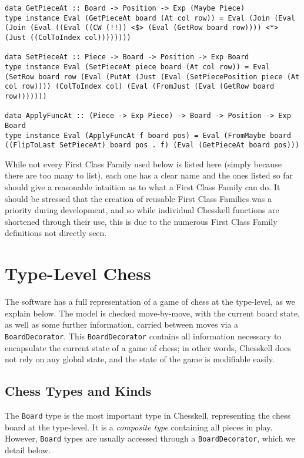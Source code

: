 \documentclass[12pt, a4paper, bibliography=totocnumbered]{scrreprt}
\newcommand{\inline}[1]{\lstinline[basicstyle=\ttfamily\footnotesize]{#1}}
\begin{document}
\begin{lstlisting}
data GetPieceAt :: Board -> Position -> Exp (Maybe Piece)
type instance Eval (GetPieceAt board (At col row)) = Eval (Join (Eval (Join (Eval ((Eval ((CW (!!)) <$> (Eval (GetRow board row)))) <*> (Just ((ColToIndex col))))))))

data SetPieceAt :: Piece -> Board -> Position -> Exp Board
type instance Eval (SetPieceAt piece board (At col row)) = Eval (SetRow board row (Eval (PutAt (Just (Eval (SetPiecePosition piece (At col row)))) (ColToIndex col) (Eval (FromJust (Eval (GetRow board row)))))))

data ApplyFuncAt :: (Piece -> Exp Piece) -> Board -> Position -> Exp Board
type instance Eval (ApplyFuncAt f board pos) = Eval (FromMaybe board ((FlipToLast SetPieceAt) board pos . f) (Eval (GetPieceAt board pos)))
\end{lstlisting}

While not every First Class Family used below is listed here (simply because there are too many to list), each one has a clear name and the ones listed so far should give a reasonable intuition as to what a First Class Family can do. It should be stressed that the creation of reusable First Class Families was a priority during development, and so while individual Chesskell functions are shortened through their use, this is due to the numerous First Class Family definitions not directly seen.

\section{Type-Level Chess}

The software has a full representation of a game of chess at the type-level, as we explain below. The model is checked move-by-move, with the current board state, as well as some further information, carried between moves via a \inline{BoardDecorator}. This \inline{BoardDecorator} contains all information necessary to encapsulate the current state of a game of chess; in other words, Chesskell does not rely on any global state, and the state of the game is modifiable easily.

\subsection{Chess Types and Kinds}

The \inline{Board} type is the most important type in Chesskell, representing the chess board at the type-level. It is a \emph{composite type} containing all pieces in play. However, \inline{Board} types are usually accessed through a  \inline{BoardDecorator}, which we detail below.
\end{document}
